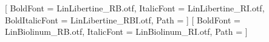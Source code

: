 \documentclass[a4paper, 15pt]{article}
\begin{document}
    \setmainfont{LinLibertine_R.otf}[
        BoldFont = LinLibertine_RB.otf,
        ItalicFont = LinLibertine_RI.otf,
        BoldItalicFont = LinLibertine_RBI.otf,
        Path = ]
    \setsansfont{LinBiolinum_R.otf}[
        BoldFont = LinBiolinum_RB.otf,
        ItalicFont = LinBiolinum_RI.otf,
        Path = ]

    \setlength{\parindent}{0cm}

    \newcommand{\truncateellipses}[2]{
       \truncate{#2}{#1}
    }

    \setcounter{secnumdepth}{0}

\end{document}
